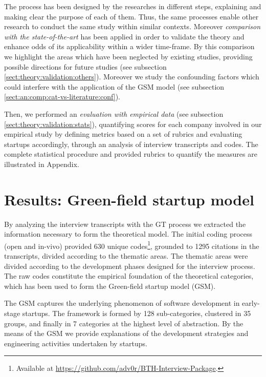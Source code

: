 \documentclass[10pt,journal,letterpaper,compsoc]{IEEEtran}
\begin{document}
The process has been designed by the researches in different steps, explaining and making clear the purpose of each of them. Thus, the same processes enable other research to conduct the same study within similar contexts. Moreover \textit{comparison with the state-of-the-art} has been applied in order to validate the theory and enhance odds of its applicability within a wider time-frame. By this comparison we  highlight the areas which have been neglected by existing studies, providing possible directions for future studies (see subsection \ref{sect:theory:validation:others}). Moreover we study the confounding factors which could interfere with the application of the GSM model (see subsection \ref{sect:an:comp:cat-vs-literature:conf}).

Then, we performed an \textit{evaluation with empirical data} (see subsection \ref{sect:theory:validation:stats}), quantifying scores for each company involved in our empirical study by defining metrics based on a set of rubrics and evaluating startups accordingly, through an analysis of interview transcripts and codes. The complete statistical procedure and provided  rubrics  to quantify the measures are illustrated in Appendix.



\section{Results: Green-field startup model}
\label{res:gsm}

By analyzing the interview transcripts with the GT process we extracted the 
information necessary to form the theoretical model. The initial coding process 
(open and in-vivo) provided 630 unique codes\footnote{Available at 
\url{https://github.com/adv0r/BTH-Interview-Package}.}, grounded to 1295 
citations in the transcripts, divided according to the thematic areas. The 
thematic areas were divided according to the development phases designed for the 
interview process. The raw codes constitute the empirical foundation of the 
theoretical categories, which has been used to form the Green-field startup 
model (GSM).

The GSM captures the underlying phenomenon of software development in 
early-stage startups. The framework is formed by 128 sub-categories, clustered 
in 35 groups, and finally in 7 categories at the highest level of abstraction. 
By the means of the GSM we provide explanations of the development strategies 
and engineering activities undertaken by startups.
\end{document}

